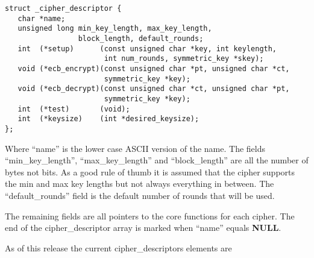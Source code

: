 \documentclass{book}
\begin{document}
\begin{verbatim}
struct _cipher_descriptor {
   char *name;
   unsigned long min_key_length, max_key_length, 
                 block_length, default_rounds;
   int  (*setup)      (const unsigned char *key, int keylength, 
                       int num_rounds, symmetric_key *skey);
   void (*ecb_encrypt)(const unsigned char *pt, unsigned char *ct, 
                       symmetric_key *key);
   void (*ecb_decrypt)(const unsigned char *ct, unsigned char *pt,
                       symmetric_key *key);
   int  (*test)       (void);
   int  (*keysize)    (int *desired_keysize);
};
\end{verbatim}

Where ``name'' is the lower case ASCII version of the name.  The fields ``min\_key\_length'', ``max\_key\_length'' and
``block\_length'' are all the number of bytes not bits.  As a good rule of thumb it is assumed that the cipher supports
the min and max key lengths but not always everything in between.  The ``default\_rounds'' field is the default number
of rounds that will be used.

The remaining fields are all pointers to the core functions for each cipher.  The end of the cipher\_descriptor array is
marked when ``name'' equals {\bf NULL}.

As of this release the current cipher\_descriptors elements are
\end{document}
